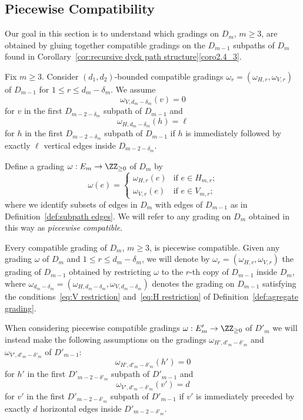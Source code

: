\subsection{Piecewise Compatibility}
\label{sec:piecewise compatibility}
Our goal in this section is to understand which gradings on $D_m$, $m\ge3$, are obtained by gluing together compatible gradings on the $D_{m-1}$ subpaths of $D_m$ found in Corollary~\ref{cor:recursive dyck path structure}\ref {coro2.4_3}.
\begin{definition}
 \label{def:agregate grading}
 Fix $m\ge3$. Consider $(d_1,d_2)$-bounded compatible gradings $\omega_r=(\omega_{H,r},\omega_{V,r})$ of $D_{m-1}$ for $1\le r\le d_m-\delta_m$. We assume
 \begin{equation}
 \label{eq:V restriction}
 \omega_{V,d_m-\delta_m}(v)=0
 \end{equation}
 for $v$ in the first $D_{m-2-\delta_m}$ subpath of $D_{m-1}$ and
 \begin{equation}
 \label{eq:H restriction}
 \omega_{H,d_m-\delta_m}(h)=\ell
 \end{equation}
 for $h$ in the first $D_{m-2-\delta_m}$ subpath of $D_{m-1}$ if $h$ is immediately followed by exactly $\ell$ vertical edges inside $D_{m-2-\delta_m}$. 

 Define a grading $\omega:E_m\to\ZZ_{\ge0}$ of $D_m$ by
 \[\omega(e)=\begin{cases}\omega_{H,r}(e) & \text{if $e\in H_{m,r}$;}\\ \omega_{V,r}(e) & \text{if $e\in V_{m,r}$;}\end{cases}\]
 where we identify subsets of edges in $D_m$ with edges of $D_{m-1}$ as in Definition~\ref{def:subpath edges}. We will refer to any grading on $D_m$ obtained in this way as \emph{piecewise compatible}.
\end{definition}
\begin{remark}
 \label{rem:restricted gradings}
 Every compatible grading of $D_m$, $m\ge3$, is piecewise compatible. 
 Given any grading $\omega$ of $D_m$ and $1\le r\le d_m-\delta_m$, we will denote by $\omega_r=(\omega_{H,r},\omega_{V,r})$ the grading of $D_{m-1}$ obtained by restricting $\omega$ to the $r$-th copy of $D_{m-1}$ inside $D_m$, where $\omega_{d_m-\delta_m}=(\omega_{H,d_m-\delta_m},\omega_{V,d_m-\delta_m})$ denotes the grading on $D_{m-1}$ satisfying the conditions~\eqref{eq:V restriction} and~\eqref{eq:H restriction} of Definition~\ref{def:agregate grading}.
\end{remark}
\begin{remark}
 \label{rem:alternate restrictions}
 When considering piecewise compatible gradings $\omega:E'_m\to\ZZ_{\ge0}$ of $D'_m$ we will instead make the following assumptions on the gradings $\omega_{H',d'_m-\delta'_m}$ and $\omega_{V',d'_m-\delta'_m}$ of $D'_{m-1}$:
 \[\omega_{H',d'_m-\delta'_m}(h')=0\]
 for $h'$ in the first $D'_{m-2-\delta'_m}$ subpath of $D'_{m-1}$ and
 \[\omega_{V',d'_m-\delta'_m}(v')=d\]
 for $v'$ in the first $D'_{m-2-\delta'_m}$ subpath of $D'_{m-1}$ if $v'$ is immediately preceded by exactly $d$ horizontal edges inside $D'_{m-2-\delta'_m}$. 
\end{remark}

